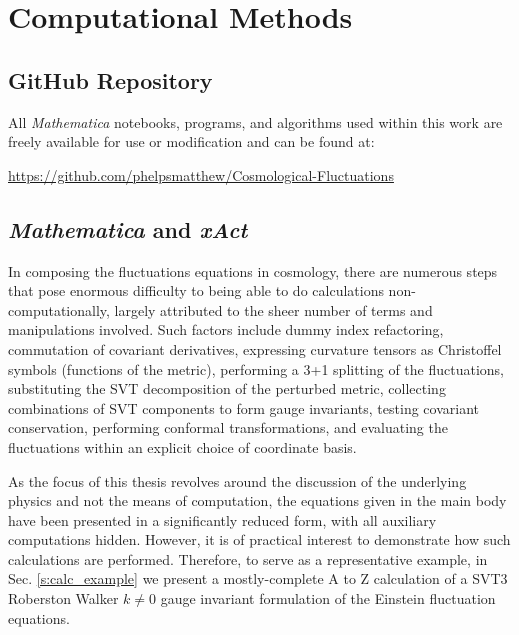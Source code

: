 
\chapter{Computational Methods}
\label{ac:computation}
\section{GitHub Repository}
All \textit{Mathematica} notebooks, programs, and algorithms used within this work are freely available for use or modification and can be found at: 
\begin{center}
	\url{https://github.com/phelpsmatthew/Cosmological-Fluctuations}
\end{center}

\section{\textit{Mathematica} and \textit{xAct}}

In composing the fluctuations equations in cosmology, there are numerous steps that pose enormous difficulty to being able to do calculations non-computationally, largely attributed to the sheer number of terms and manipulations involved. Such factors include dummy index refactoring, commutation of covariant derivatives, expressing curvature tensors as Christoffel symbols (functions of the metric), performing a 3+1 splitting of the fluctuations, substituting the SVT decomposition of the perturbed metric, collecting combinations of SVT components to form gauge invariants, testing covariant conservation, performing conformal transformations, and evaluating the fluctuations within an explicit choice of coordinate basis.

As the focus of this thesis revolves around the discussion of the underlying physics and not the means of computation, the equations given in the main body have been presented in a significantly reduced form, with all auxiliary computations hidden. However, it is of practical interest to demonstrate how such calculations are performed. Therefore, to serve as a representative example, in Sec. \ref{s:calc_example} we present a mostly-complete A to Z calculation of a SVT3 Roberston Walker $k\ne 0$ gauge invariant formulation of the Einstein fluctuation equations.

